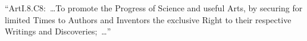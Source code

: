 \documentclass[convert=imagemagick]{standalone}
\begin{document}
\parbox[t][36pt][c]{300pt}{
	``ArtI.\textsection8.C8:\ \dots To promote the Progress of Science
	and useful Arts, by securing for limited Times to Authors and
	Inventors the exclusive Right to their respective Writings and
	Discoveries;\ \dots''
}
\end{document}
